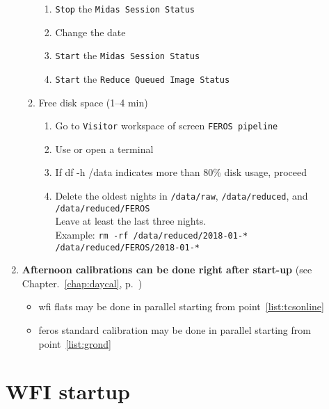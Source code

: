 \documentclass[11pt,fleqn]{book}
\def\chapref#1{Chapter.~\ref{chap:#1}, p.~\pageref{chap:#1}}
\begin{document}
\begin{enumerate}
\begin{enumerate}
\begin{enumerate}
		  \item \texttt{Stop} the \texttt{Midas Session Status}
		  \item Change the date 
		  \item \texttt{Start} the \texttt{Midas Session Status}
		  \item \texttt{Start} the \texttt{Reduce Queued Image Status}
		\end{enumerate}
		\item Free disk space (1--4 min)
		\begin{enumerate}
		    \item Go to \texttt{Visitor} workspace of screen \texttt{FEROS pipeline}
		    \item Use or open a terminal
		    \item If df -h /data indicates more than 80\% disk usage, proceed
		    \item Delete the oldest nights in \texttt{/data/raw}, \texttt{/data/reduced}, and
		    \texttt{/data/reduced/FEROS}\\
		          Leave at least the last three nights.\\
		          Example: \texttt{rm -rf /data/reduced/2018-01-* /data/reduced/FEROS/2018-01-*}
		\end{enumerate}
	\end{enumerate} 
    \item\textbf{Afternoon calibrations can be done right after start-up} (see \chapref{daycal})
        \begin{itemize}
        \item \gls{wfi} flats may be done in parallel starting from point~\ref{list:tcsonline}
        \item \gls{feros} standard calibration may be done in parallel starting from point~\ref{list:grond}
        \end{itemize}
\end{enumerate}
\newpage

\section{WFI startup}
\end{document}
